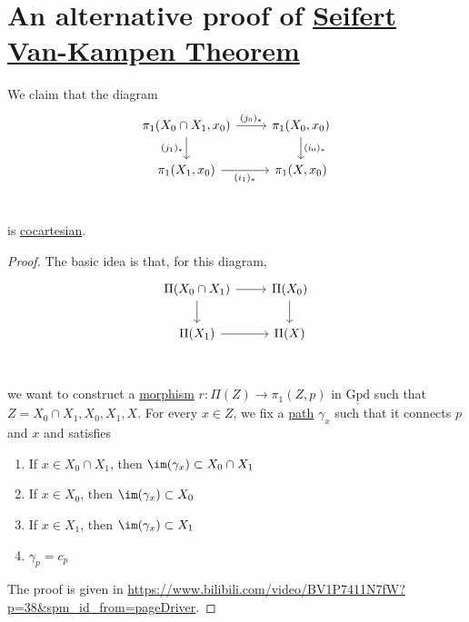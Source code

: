 \section{An alternative proof of \hyperref[thm:Seifert-Van-Kampen-Theorem]{Seifert Van-Kampen Theorem}}\label{pf:an-alternative-proof-of-Seifert-Van-Kampen-thm}
\begin{theorem}
	We claim that the diagram
	\[
		\begin{tikzcd}
			{\pi_1(X_0\cap X_1, x_0)} & {\pi_1(X_0, x_0)} \\
			{\pi_1(X_1, x_0)} & {\pi_1(X, x_0)} \\
			\arrow["{(j_0)_\ast}", from=1-1, to=1-2]
			\arrow["{(i_0)_\ast}", from=1-2, to=2-2]
			\arrow["{(i_1)_\ast}"', from=2-1, to=2-2]
			\arrow["{(j_1)_\ast}"', from=1-1, to=2-1]
		\end{tikzcd}
	\]
	is \hyperref[def:cocartesian]{cocartesian}.
\end{theorem}
\begin{proof}
	The basic idea is that, for this diagram,
	\[
		\begin{tikzcd}
			{\Pi(X_0\cap X_1)} & {\Pi(X_0)} \\
			{\Pi(X_1)} & {\Pi(X)} \\
			\arrow[from=1-1, to=1-2]
			\arrow[from=1-2, to=2-2]
			\arrow[from=2-1, to=2-2]
			\arrow[from=1-1, to=2-1]
		\end{tikzcd}
	\]
	we want to construct a \hyperref[def:morphism]{morphism} \(r\colon \Pi (Z)\to \pi _1(Z, p)\) in \(\underline{\mathrm{Gpd}}\) such that
	\(Z = X_0 \cap X_1, X_0, X_1, X\). For every \(x\in Z\), we fix a \hyperref[def:path]{path} \(\gamma _{x} \) such that it connects \(p\) and \(x\) and satisfies
	\begin{enumerate}
		\item If \(x\in X_0 \cap X_1\), then \(\im  (\gamma _{x} )\subset X_0 \cap X_1\)
		\item If \(x\in X_0\), then \(\im  (\gamma _{x} )\subset X_0\)
		\item If \(x\in X_1\), then \(\im  (\gamma _{x} )\subset X_1\)
		\item \(\gamma _p = c_p\)
	\end{enumerate}

	The proof is given in \url{https://www.bilibili.com/video/BV1P7411N7fW?p=38&spm_id_from=pageDriver}.
\end{proof}

